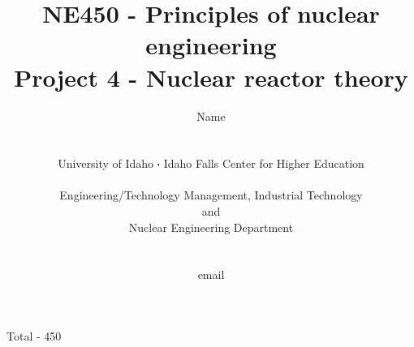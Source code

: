 \documentclass[11pt,a4paper]{article}
\newcommand*\sq{\mathbin{\vcenter{\hbox{\rule{.3ex}{.3ex}}}}} %
\begin{document}
\begin{titlepage}
    \title{
        NE450 - Principles of nuclear engineering\\
        Project 4 - Nuclear reactor theory\\
    }
    \author{
        Name
        \\ \\ \\
        University of Idaho $\sq$ Idaho Falls Center for Higher Education
        \\ \\
        Engineering/Technology Management, Industrial Technology\\and\\Nuclear Engineering Department
        \\ \\ \\
        email 
    }
\clearpage %
\maketitle
\vspace*{\fill}
\begin{flushright}{
        Total - 450 
}
\end{flushright}
\thispagestyle{empty} %
\end{titlepage}
\end{document}

